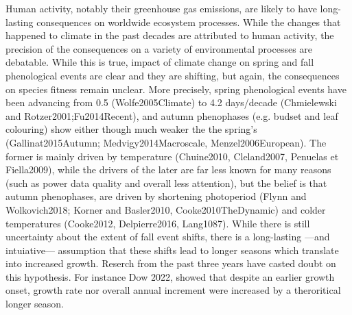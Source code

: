 \documentclass{article}
\begin{document}
Human activity, notably their greenhouse gas emissions, are likely to have long-lasting consequences on worldwide ecosystem processes. While the changes that happened to climate in the past decades are attributed to human activity, the precision of the  consequences on a variety of environmental processes are debatable. While this is true, impact of climate change on spring and fall phenological events are clear and they are shifting, but again, the consequences on species fitness remain unclear. More precisely, spring phenological events have been advancing from 0.5 (Wolfe2005Climate) to 4.2 days/decade (Chmielewski and Rotzer2001;Fu2014Recent), and autumn phenophases (e.g. budset and leaf colouring) show either though much weaker the the spring's (Gallinat2015Autumn; Medvigy2014Macroscale, Menzel2006European). The former is mainly driven by temperature (Chuine2010, Cleland2007, Penuelas et Fiella2009), while the drivers of the later are far less known for many reasons (such as power data quality and overall less attention), but the belief is that autumn phenophases, are driven by shortening photoperiod (Flynn and Wolkovich2018; Korner and Basler2010, Cooke2010TheDynamic) and colder temperatures (Cooke2012, Delpierre2016, Lang1087). While there is still uncertainty about the extent of fall event shifts, there is a long-lasting ---and intuiative---  assumption that these shifts lead to longer seasons which translate into increased growth. Reserch from the past three years have casted doubt on this hypothesis. For instance Dow 2022, showed that despite an earlier growth onset, growth rate nor overall annual increment were increased by a theroritical longer season. 
\par
\end{document}
